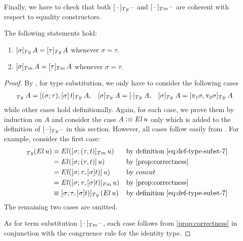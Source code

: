 \documentclass[a4paper,UKenglish,numberwithinsect,cleveref,thm-restate]{lipics-v2021}
\newcommand{\danger}{\marginpar[\hfill\dbend]{\dbend\hfill}}
\begin{document}
Finally, we have to check that both $[\blank]_{\Ty}\blank$ and $[\blank]_{\Tm}\blank$ are coherent with respect to equality constructors.
\begin{proposition}[Coherence] \label{prop:coherence-2}
  The following statements hold:
  \danger
  \begin{enumerate}
    \item $[\sigma]_{\Ty}\,A = [\tau]_{\Ty}\,A$ whenever $\sigma = \tau$.
    \item $[\sigma]_{\Tm}\,A = [\tau]_{\Tm}\,A$ whenever $\sigma = \tau$.
  \end{enumerate}
\end{proposition}
\begin{proof}
  By , for type substitution, we only have to consider the following cases 
  \begin{align*}
    [\sigma; (\tau, t)]_{\Ty} \;A    & = [(\sigma;\tau), [\sigma]\, t]_{\Ty}\;A,
                                     & [\sigma]_{\Ty} \;A               & = [\emptyctx]_{\Ty}\;A,
                                     & [\sigma]_{\Ty} \;A               & = [\pi_1\sigma, \pi_2\sigma]_{\Ty}\;A
  \end{align*}
  while other cases hold definitionally.
  Again, for each case, we prove them by induction on $A$ and consider the case $A \defeq \El\,u$ only which is added to the definition of $[\blank]_{\Ty}\blank$ in this section. 
  However, all cases follow easily from .
  For example, consider the first case:
  \begin{align*}
    [\sigma; (\tau, t)]_{\Ty}(\El\,u) & \judgeq \El([\sigma; (\tau, t)]_{\Tm}\,u) && \text{by definition \eqref{eq:def-type-subst-7}} \\
                                      & = \El( [\sigma; (\tau, t)]\,u)            && \text{by \cref{prop:correctness}} \\
                                      & = \El( [\sigma; \tau, [\sigma]t)]\,u)     && \text{by $\mathsf{concat}$} \\
                                      & = \El( [\sigma; \tau, [\sigma]t)]_{\Tm}\,u) && \text{by \cref{prop:correctness}} \\
                                      & \judgeq [\sigma; \tau, [\sigma]t)]_{\Ty}\left(\El\,u\right) && \text{by definition \eqref{eq:def-type-subst-7} }
  \end{align*}
  The remaining two cases are omitted.

  As for term substitution $[\blank]_{\Tm}\blank$, each case follows from \cref{prop:correctness} in conjunction with the congruence rule for the identity type.
\end{proof}
\end{document}
